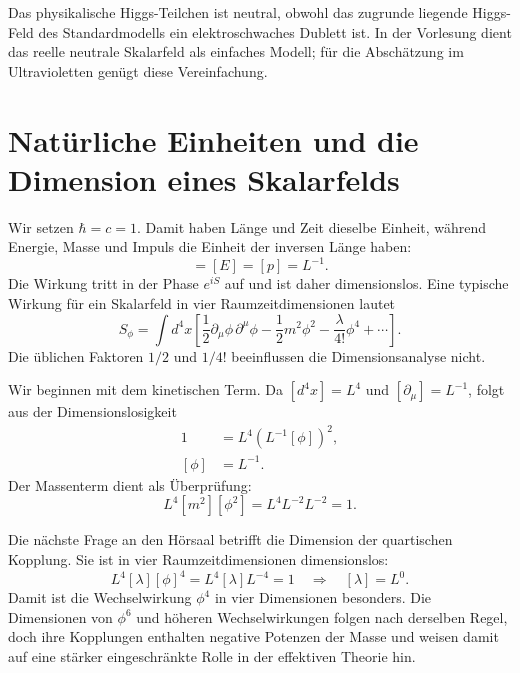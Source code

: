 Das physikalische Higgs-Teilchen ist neutral, obwohl das zugrunde liegende Higgs-Feld des Standardmodells ein elektroschwaches Dublett ist. In der Vorlesung dient das reelle neutrale Skalarfeld als einfaches Modell; für die Abschätzung im Ultravioletten genügt diese Vereinfachung.

\section{Natürliche Einheiten und die Dimension eines Skalarfelds}

Wir setzen \(\hbar=c=1\). Damit haben Länge und Zeit dieselbe Einheit, während Energie, Masse und Impuls die Einheit der inversen Länge haben:
\begin{equation}
[m]=[E]=[p]=L^{-1}.
\end{equation}
Die Wirkung tritt in der Phase \(e^{iS}\) auf und ist daher dimensionslos. Eine typische Wirkung für ein Skalarfeld in vier Raumzeitdimensionen lautet
\begin{equation}
S_\phi=\int d^4x\left[
\frac12\partial_\mu\phi\,\partial^\mu\phi
-\frac12m^2\phi^2
-\frac{\lambda}{4!}\phi^4
+\cdots\right].
\end{equation}
Die üblichen Faktoren \(1/2\) und \(1/4!\) beeinflussen die Dimensionsanalyse nicht.

Wir beginnen mit dem kinetischen Term. Da \([d^4x]=L^4\) und \([\partial_\mu]=L^{-1}\), folgt aus der Dimensionslosigkeit
\begin{align}
1
&=L^4\left(L^{-1}[\phi]\right)^2,\\
[\phi]&=L^{-1}.
\end{align}
Der Massenterm dient als Überprüfung:
\begin{equation}
L^4[m^2][\phi^2]
=L^4L^{-2}L^{-2}=1.
\end{equation}

Die nächste Frage an den Hörsaal betrifft die Dimension der quartischen Kopplung. Sie ist in vier Raumzeitdimensionen dimensionslos:
\begin{equation}
L^4[\lambda][\phi]^4=L^4[\lambda]L^{-4}=1
\quad\Longrightarrow\quad [\lambda]=L^0.
\end{equation}
Damit ist die Wechselwirkung \(\phi^4\) in vier Dimensionen besonders. Die Dimensionen von \(\phi^6\) und höheren Wechselwirkungen folgen nach derselben Regel, doch ihre Kopplungen enthalten negative Potenzen der Masse und weisen damit auf eine stärker eingeschränkte Rolle in der effektiven Theorie hin.

